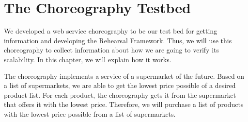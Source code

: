 \section{The Choreography Testbed}

We developed a web service choreography to be our test bed for getting information and developing the Rehearsal Framework. Thus, we will use this choreography to collect information about how we are going to verify its scalability. In this chapter, we will explain how it works.

The choreography implements a service of a supermarket of the future. Based on a list of supermarkets, we are able to get the lowest price possible of a desired product list. For each product, the choreography gets it from the supermarket that offers it with the lowest price. Therefore, we will purchase a list of products with the lowest price possible from a list of supermarkets.

